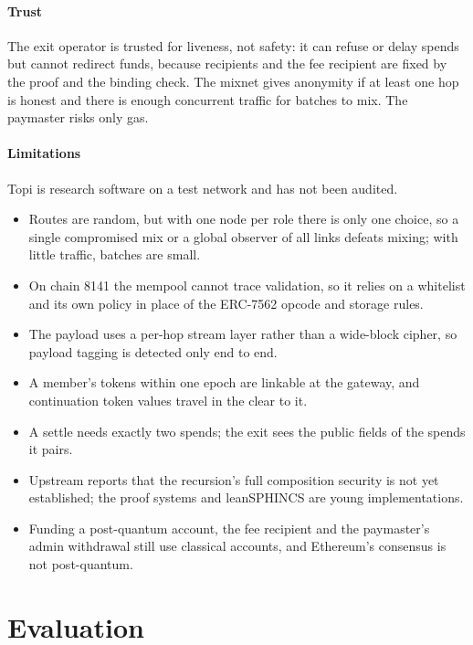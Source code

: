 \documentclass[11pt,a4paper]{article}
\begin{document}
\paragraph{Trust} The exit operator is trusted for liveness, not safety: it can refuse or delay spends but
cannot redirect funds, because recipients and the fee recipient are fixed by the proof and the binding
check. The mixnet gives anonymity if at least one hop is honest and there is enough concurrent traffic for
batches to mix. The paymaster risks only gas.

\paragraph{Limitations} Topi is research software on a test network and has not been audited.
\begin{itemize}
  \item Routes are random, but with one node per role there is only one choice, so a single compromised
    mix or a global observer of all links defeats mixing; with little traffic, batches are small.
  \item On chain 8141 the mempool cannot trace validation, so it relies on a whitelist and its own policy
    in place of the ERC-7562 opcode and storage rules.
  \item The payload uses a per-hop stream layer rather than a wide-block cipher, so payload tagging is
    detected only end to end.
  \item A member's tokens within one epoch are linkable at the gateway, and continuation token values
    travel in the clear to it.
  \item A settle needs exactly two spends; the exit sees the public fields of the spends it pairs.
  \item Upstream reports that the recursion's full composition security is not yet established; the proof
    systems and leanSPHINCS are young implementations.
  \item Funding a post-quantum account, the fee recipient and the paymaster's admin withdrawal still use
    classical accounts, and Ethereum's consensus is not post-quantum.
\end{itemize}

\section{Evaluation}
\end{document}
